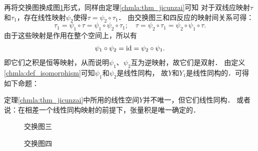 再将交换图换成图\ref{chmla:pic_exchange4}形式，同样由定理\ref{chmla:thm_jicunzai}可知
对于双线应映射$\tau$和$\tau_1$，存在线性映射$\psi_2$使得$\tau=\psi_2 \circ \tau_1$．
由交换图三和四反应的映射间关系可得：
\begin{equation}
    \tau_1 =\psi_1 \circ \tau = \psi_1 \circ \psi_2 \circ \tau_1; \quad
    \tau =\psi_2 \circ \tau_1 =\psi_2 \circ\psi_1 \circ \tau .
\end{equation}
由于这些映射是作用在整个空间上，所以有
\begin{align}
    \psi_1 \circ \psi_2 = {\rm id} = \psi_2 \circ\psi_1 .
\end{align}
即它们之积是恒等映射，从而说明$\psi_1$、$\psi_2$互为逆映射，故它们是双射．
由定义\ref{chmla:def_isomorphism}可知$\psi_1$和$\psi_2$是线性同构，
故$Y$和$Y_1$是线性同构的．可得如下命题：

\begin{proposition}\label{chmla:thm_unique}
    定理\ref{chmla:thm_jicunzai}中所用的线性空间$Y$并不唯一，但它们线性同构．
    或者说：在相差一个线性同构映射的前提下，张量积是唯一确定的．
\end{proposition}

\begin{figure}[htb]
    \begin{minipage}[t]{0.49\textwidth}
        \centering
        \caption{交换图三}\label{chmla:pic_exchange3}
    \end{minipage}
    \begin{minipage}[t]{0.49\textwidth}
        \caption{交换图四}\label{chmla:pic_exchange4}
    \end{minipage}
\end{figure}


